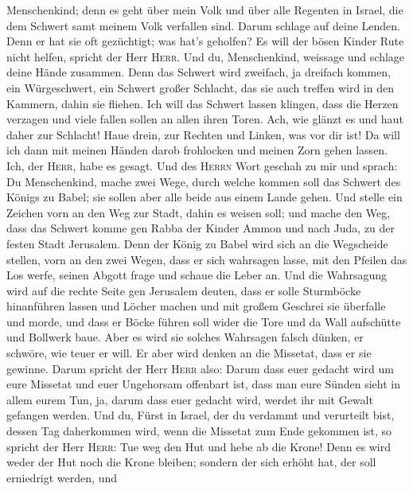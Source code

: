 Menschenkind; denn es geht über mein Volk und über alle Regenten in
Israel, die dem Schwert samt meinem Volk verfallen sind. Darum schlage
auf deine Lenden.  Denn er hat sie oft gezüchtigt; was
hat's geholfen? Es will der bösen Kinder Rute nicht helfen, spricht der
Herr \textsc{Herr}.  Und du, Menschenkind, weissage und
schlage deine Hände zusammen. Denn das Schwert wird zweifach, ja
dreifach kommen, ein Würgeschwert, ein Schwert großer Schlacht, das sie
auch treffen wird in den Kammern, dahin sie fliehen.  Ich
will das Schwert lassen klingen, dass die Herzen verzagen und viele
fallen sollen an allen ihren Toren. Ach, wie glänzt es und haut daher
zur Schlacht!  Haue drein, zur Rechten und Linken, was
vor dir ist!  Da will ich dann mit meinen Händen darob
frohlocken und meinen Zorn gehen lassen. Ich, der \textsc{Herr}, habe es
gesagt.  Und des \textsc{Herrn} Wort geschah zu mir und
sprach:  Du Menschenkind, mache zwei Wege, durch welche
kommen soll das Schwert des Königs zu Babel; sie sollen aber alle beide
aus einem Lande gehen.  Und stelle ein Zeichen vorn an
den Weg zur Stadt, dahin es weisen soll; und mache den Weg, dass das
Schwert komme gen Rabba der Kinder Ammon und nach Juda, zu der festen
Stadt Jerusalem.  Denn der König zu Babel wird sich an
die Wegscheide stellen, vorn an den zwei Wegen, dass er sich wahrsagen
lasse, mit den Pfeilen das Los werfe, seinen Abgott frage und schaue die
Leber an.  Und die Wahrsagung wird auf die rechte Seite
gen Jerusalem deuten, dass er solle Sturmböcke hinanführen lassen und
Löcher machen und mit großem Geschrei sie überfalle und morde, und dass
er Böcke führen soll wider die Tore und da Wall aufschütte und Bollwerk
baue.  Aber es wird sie solches Wahrsagen falsch dünken,
er schwöre, wie teuer er will. Er aber wird denken an die Missetat, dass
er sie gewinne.  Darum spricht der Herr \textsc{Herr}
also: Darum dass euer gedacht wird um eure Missetat und euer Ungehorsam
offenbart ist, dass man eure Sünden sieht in allem eurem Tun, ja, darum
dass euer gedacht wird, werdet ihr mit Gewalt gefangen werden.
 Und du, Fürst in Israel, der du verdammt und verurteilt
bist, dessen Tag daherkommen wird, wenn die Missetat zum Ende gekommen
ist,  so spricht der Herr \textsc{Herr}: Tue weg den Hut
und hebe ab die Krone! Denn es wird weder der Hut noch die Krone
bleiben; sondern der sich erhöht hat, der soll erniedrigt werden, und
